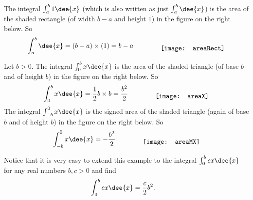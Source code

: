 \begin{eg}
The integral $\int_a^b 1\dee{x}$ (which is also written as just $\int_a^b\dee{x}$) is
the
area of
the shaded rectangle (of width $b-a$ and height $1$) in the figure on
the right below. So
\begin{align*}
\int_a^b\dee{x} = (b-a)\times (1)=b-a\qquad\qquad
\raisebox{-0.5\height}{\texttt{[image: areaRect]}}
\end{align*}
\end{eg}


\begin{eg}\label{eg:INTtriangle}
Let $b>0$.
The integral $\int_0^b x\dee{x}$  is the area of
the shaded triangle (of base $b$ and of height $b$) in the figure on
the right below. So
\begin{align*}
\int_0^b x\dee{x} = \frac{1}{2}b\times b=\frac{b^2}{2}\qquad\qquad
\raisebox{-0.5\height}{\texttt{[image: areaX]}}
\end{align*}
The integral $\int_{-b}^0 x\dee{x}$  is the signed area of
the shaded triangle (again of base $b$ and of height $b$) in the figure on
the right below. So
\begin{align*}
\int_{-b}^0 x\dee{x} = -\frac{b^2}{2}\qquad\qquad
\raisebox{-0.5\height}{\texttt{[image: areaMX]}}
\end{align*}
\end{eg}
Notice that it is very easy to extend this example to the integral $\int_0^b
c x\dee{x}$ for any real numbers $b,c>0$ and find
\begin{align*}
\int_0^b c x\dee{x} &= \frac{c}{2} b^2.
\end{align*}

